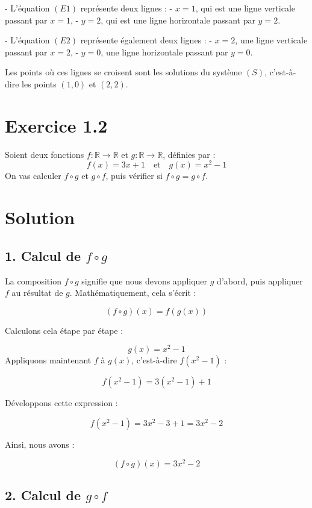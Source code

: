 \documentclass[a4paper,oneside,12pt]{amsbook}
\newcommand{\R}{\mathbb{R}}
\theoremstyle{definition}
\theoremstyle{remark}
\begin{document}
- L'équation \((E1)\) représente deux lignes :
  - \(x = 1\), qui est une ligne verticale passant par \(x = 1\),
  - \(y = 2\), qui est une ligne horizontale passant par \(y = 2\).
  
- L'équation \((E2)\) représente également deux lignes :
  - \(x = 2\), une ligne verticale passant par \(x = 2\),
  - \(y = 0\), une ligne horizontale passant par \(y = 0\).

Les points où ces lignes se croisent sont les solutions du système \((S)\), c'est-à-dire les points \((1, 0)\) et \((2, 2)\).

 \section*{Exercice 1.2} Soient deux fonctions \( f : \R \to \R \) et \( g: \R \to \R \), définies par :
\[
f(x) = 3x + 1 \quad \text{et} \quad g(x) = x^2 - 1
\]
On vas calculer \( f \circ g \) et \( g \circ f \), puis vérifier si \( f \circ g = g \circ f \).

\section*{Solution}

\subsection*{1. Calcul de \( f \circ g \)}

La composition \( f \circ g \) signifie que nous devons appliquer \( g \) d'abord, puis appliquer \( f \) au résultat de \( g \). Mathématiquement, cela s'écrit :

\[
(f \circ g)(x) = f(g(x))
\]

Calculons cela étape par étape :

\[
g(x) = x^2 - 1
\]
Appliquons maintenant \( f \) à \( g(x) \), c'est-à-dire \( f(x^2 - 1) \) :

\[
f(x^2 - 1) = 3(x^2 - 1) + 1
\]

Développons cette expression :

\[
f(x^2 - 1) = 3x^2 - 3 + 1 = 3x^2 - 2
\]

Ainsi, nous avons :

\[
(f \circ g)(x) = 3x^2 - 2
\]

\subsection*{2. Calcul de \( g \circ f \)}
\end{document}
